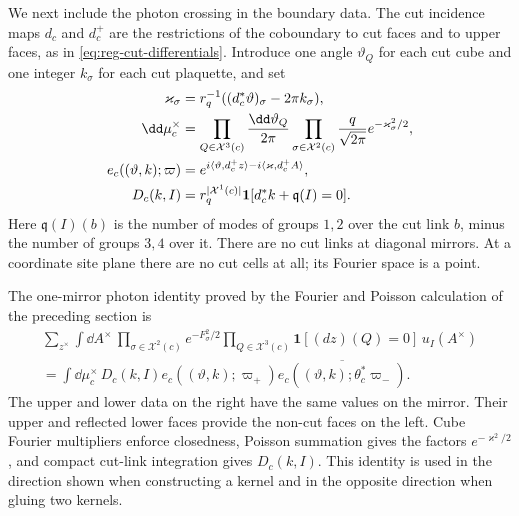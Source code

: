 We next include the photon crossing in the boundary data. The cut
incidence maps $d_c$ and $d_c^+$ are the restrictions of the coboundary
to cut faces and to upper faces, as in
\eqref{eq:reg-cut-differentials}. Introduce one angle $\vartheta_Q$
for each cut cube and one integer $k_\sigma$ for each cut plaquette,
and set
\begin{align}\label{eq:slab-dual-measure}
 \varkappa_\sigma&=r_q^{-1}
       ((d_c^*\vartheta)_\sigma-2\pi k_\sigma),\notag\\
 \dd\mu_c^\times&=
      \prod_{Q\in\mathcal X^3(c)}\frac{\dd\vartheta_Q}{2\pi}
      \prod_{\sigma\in\mathcal X^2(c)}
                     \frac{q}{\sqrt{2\pi}}e^{-\varkappa_\sigma^2/2},\\
 e_c((\vartheta,k);\varpi)&=
       e^{i\langle\vartheta,d_c^+z\rangle
                             -i\langle\varkappa,d_c^+A\rangle},\notag\\
 D_c(k,I)&=r_q^{|\mathcal X^1(c)|}
       \mathbf1[d_c^*k+\mathfrak q(I)=0].\notag
\end{align}
Here $\mathfrak q(I)(b)$ is the number of modes of groups $1,2$ over
the cut link $b$, minus the number of groups $3,4$ over it. There are
no cut links at diagonal mirrors. At a coordinate site plane there
are no cut cells at all; its Fourier space is a point.

The one-mirror photon identity proved by the Fourier and Poisson
calculation of the preceding section is
\begin{multline}\label{eq:slab-photon-gluing}
 \sum_{z^\times}\int\dd A^\times\,
       \prod_{\sigma\in\mathcal X^2(c)}e^{-F_\sigma^2/2}
       \prod_{Q\in\mathcal X^3(c)}\mathbf1[(dz)(Q)=0]\,u_I(A^\times)
       \\
 =\int\dd\mu_c^\times\,D_c(k,I)
           e_c((\vartheta,k);\varpi_+)
            \overline{e_c((\vartheta,k);\theta_c^*\varpi_-)}.
\end{multline}
The upper and lower data on the right have the same values on the
mirror. Their upper and reflected lower faces provide the non-cut
faces on the left. Cube Fourier multipliers enforce closedness,
Poisson summation gives the factors $e^{-\varkappa^2/2}$, and compact
cut-link integration gives $D_c(k,I)$. This identity is used in the
direction shown when constructing a kernel and in the opposite
direction when gluing two kernels.

